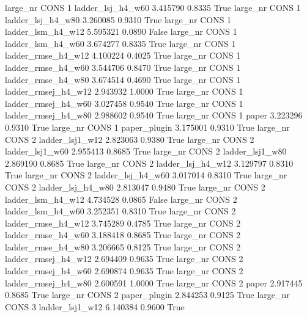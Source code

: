   large_nr     CONS                 1   ladder_lsj_h4_w60    3.415790      0.8335    True
  large_nr     CONS                 1   ladder_lsj_h4_w80    3.260085      0.9310    True
  large_nr     CONS                 1   ladder_lsm_h4_w12    5.595321      0.0890   False
  large_nr     CONS                 1   ladder_lsm_h4_w60    3.674277      0.8335    True
  large_nr     CONS                 1  ladder_rmse_h4_w12    4.100224      0.4025    True
  large_nr     CONS                 1  ladder_rmse_h4_w60    3.544706      0.8470    True
  large_nr     CONS                 1  ladder_rmse_h4_w80    3.674514      0.4690    True
  large_nr     CONS                 1 ladder_rmsej_h4_w12    2.943932      1.0000    True
  large_nr     CONS                 1 ladder_rmsej_h4_w60    3.027458      0.9540    True
  large_nr     CONS                 1 ladder_rmsej_h4_w80    2.988602      0.9540    True
  large_nr     CONS                 1               paper    3.223296      0.9310    True
  large_nr     CONS                 1        paper_plugin    3.175001      0.9310    True
  large_nr     CONS                 2     ladder_lsj1_w12    2.823063      0.9380    True
  large_nr     CONS                 2     ladder_lsj1_w60    2.955413      0.8685    True
  large_nr     CONS                 2     ladder_lsj1_w80    2.869190      0.8685    True
  large_nr     CONS                 2   ladder_lsj_h4_w12    3.129797      0.8310    True
  large_nr     CONS                 2   ladder_lsj_h4_w60    3.017014      0.8310    True
  large_nr     CONS                 2   ladder_lsj_h4_w80    2.813047      0.9480    True
  large_nr     CONS                 2   ladder_lsm_h4_w12    4.734528      0.0865   False
  large_nr     CONS                 2   ladder_lsm_h4_w60    3.252351      0.8310    True
  large_nr     CONS                 2  ladder_rmse_h4_w12    3.745289      0.4785    True
  large_nr     CONS                 2  ladder_rmse_h4_w60    3.188418      0.8685    True
  large_nr     CONS                 2  ladder_rmse_h4_w80    3.206665      0.8125    True
  large_nr     CONS                 2 ladder_rmsej_h4_w12    2.694409      0.9635    True
  large_nr     CONS                 2 ladder_rmsej_h4_w60    2.690874      0.9635    True
  large_nr     CONS                 2 ladder_rmsej_h4_w80    2.600591      1.0000    True
  large_nr     CONS                 2               paper    2.917445      0.8685    True
  large_nr     CONS                 2        paper_plugin    2.844253      0.9125    True
  large_nr     CONS                 3     ladder_lsj1_w12    6.140384      0.9600    True
